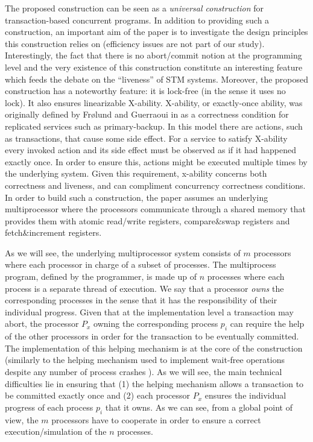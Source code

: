 The proposed construction can be seen as a 
{\it universal construction} for transaction-based concurrent programs. 
%
%
In addition to providing such a construction, an important aim of the paper  
is to investigate the design principles this construction relies on
(efficiency issues are not part of our study). Interestingly, 
the fact that there is no abort/commit notion at the programming level 
and the very existence of this construction constitute an interesting feature
which feeds the debate on the  ``liveness''  of STM systems. Moreover, 
the proposed construction has a noteworthy feature: it is lock-free 
(in the sense it uses no lock). 
%
It also ensures linearizable X-ability.
X-ability, or exactly-once ability, was originally defined 
by Fr{\o}lund and Guerraoui in \cite{FG01}
as a correctness condition for replicated services such as
primary-backup.  In this model there are actions, such as
transactions, that cause some side effect.  For a service to satisfy
X-ability every invoked action and its side effect must be observed as
if it had happened exactly once.  In order to ensure this, actions
might be executed multiple times by the underlying system.  Given this
requirement, x-ability concerns both correctness and liveness, and can
compliment concurrency correctness conditions. \\


In order to build such a construction, the paper assumes an underlying 
multiprocessor where the processors  communicate through 
a shared memory that provides them with atomic read/write registers, 
compare\&swap registers and fetch\&increment registers. 




As we will see, the underlying multiprocessor system  consists of 
$m$  processors where each processor  in charge  of a  subset of  processes.
The multiprocess program, defined by the programmer, is made up of $n$ processes
where each process is a separate thread of execution.
  We say that a processor {\it owns}
the corresponding processes in the sense that  it has the responsibility 
of their individual   progress.  Given that at  the implementation level
a  transaction may abort, the processor $P_x$ owning the corresponding 
process $p_i$ can  require the help of  the other  processors  
in order for the transaction to be eventually committed. 
The  implementation of this  helping mechanism  is at the core of the 
construction  (similarly to the helping mechanism used  to implement 
wait-free operations despite any number of process crashes \cite{H91}). 
As we  will  see, the  main technical difficulties  lie  in   ensuring that 
(1) the helping  mechanism  allows   a transaction to be committed  exactly
once and (2) each processor $P_x$ ensures the individual progress  of  each 
process $p_i$ that it owns. As we can see, from a global point of view,
the  $m$ processors have to    cooperate in order to ensure a correct
execution/simulation of the $n$  processes. 
  


